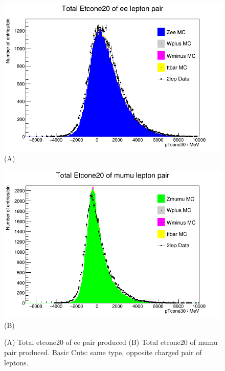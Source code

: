 \begin{figure}[h!]
    \centering
    \begin{minipage}{0.5\textwidth}
        \centering
        \includegraphics[width=\linewidth]{plots/25-02-2021/Zee-stack_total-etcone_(min-cuts_2lep=e+e-)_25-02-21_11-20.png}
        (A)
    \end{minipage}\hfill
    \begin{minipage}{0.5\textwidth}
        \centering
        \includegraphics[width=\linewidth]{plots/25-02-2021/Zmumu-stack_total-etcone_(min-cuts_2lep=mu+mu-)_25-02-21_11-20.png}
        (B)
    \end{minipage}
    \caption{(A) Total etcone20 of ee pair produced (B) Total etcone20 of mumu pair produced. Basic Cuts: same type, opposite charged pair of leptons.}
    \label{fig:Zll-stack_total-etcone_(min-cuts_2lep=l+l-)_25-02-21}
\end{figure}



